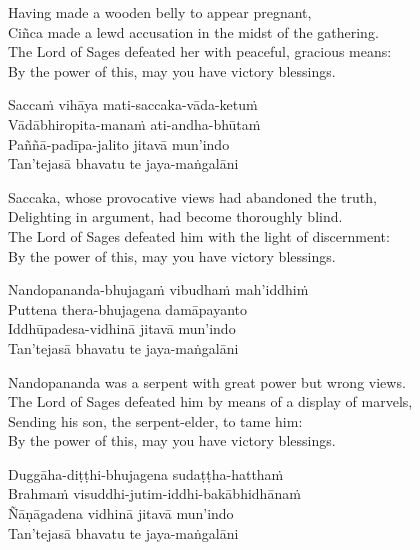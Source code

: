 \begin{english-verses}
  Having made a wooden belly to appear pregnant,\\
  Ciñca made a lewd accusation in the midst of the gathering.\\
  The Lord of Sages defeated her with peaceful, gracious means:\\
  By the power of this, may you have victory blessings.
\end{english-verses}

\begin{pali-hang-continued}
  Saccaṁ vihāya mati-saccaka-vāda-ketuṁ\\
  Vādābhiropita-manaṁ ati-andha-bhūtaṁ\\
  Paññā-padīpa-jalito jitavā mun'indo\\
  Tan'tejasā bhavatu te jaya-maṅgalāni
\end{pali-hang-continued}

\begin{english-verses}
  Saccaka, whose provocative views had abandoned the truth,\\
  Delighting in argument, had become thoroughly blind.\\
  The Lord of Sages defeated him with the light of discernment:\\
  By the power of this, may you have victory blessings.
\end{english-verses}

\begin{pali-hang-continued}
  Nandopananda-bhujagaṁ vibudhaṁ mah'iddhiṁ\\
  Puttena thera-bhujagena damāpayanto\\
  Iddhūpadesa-vidhinā jitavā mun'indo\\
  Tan'tejasā bhavatu te jaya-maṅgalāni
\end{pali-hang-continued}

\begin{english-verses}
  Nandopananda was a serpent with great power but wrong views.\\
  The Lord of Sages defeated him by means of a display of marvels,\\
  Sending his son, the serpent-elder, to tame him:\\
  By the power of this, may you have victory blessings.
\end{english-verses}

\begin{pali-hang-continued}
  Duggāha-diṭṭhi-bhujagena sudaṭṭha-hatthaṁ\\
  Brahmaṁ visuddhi-jutim-iddhi-bakābhidhānaṁ\\
  Ñāṇāgadena vidhinā jitavā mun'indo\\
  Tan'tejasā bhavatu te jaya-maṅgalāni
\end{pali-hang-continued}

